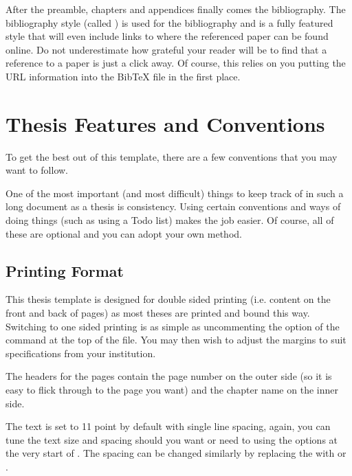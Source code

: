 After the preamble, chapters and appendices finally comes the bibliography. The 
bibliography style (called ) is used for the bibliography and 
is a fully featured style that will even include links to where the referenced 
paper can be found online. Do not underestimate how grateful your reader will be 
to find that a reference to a paper is just a click away. Of course, this relies 
on you putting the URL information into the BibTeX file in the first place.


\section{Thesis Features and Conventions}\label{ThesisConventions}

To get the best out of this template, there are a few conventions that you may 
want to follow.

One of the most important (and most difficult) things to keep track of in such 
a long document as a thesis is consistency. Using certain conventions and ways 
of doing things (such as using a Todo list) makes the job easier. Of course, 
all of these are optional and you can adopt your own method.

\subsection{Printing Format}

This thesis template is designed for double sided printing (i.e. content on the 
front and back of pages) as most theses are printed and bound this way. 
Switching to one sided printing is as simple as uncommenting the  
option of the  command at the top of the  file. 
You may then wish to adjust the margins to suit specifications from your institution.

The headers for the pages contain the page number on the outer side (so it is 
easy to flick through to the page you want) and the chapter name on the inner side.

The text is set to 11 point by default with single line spacing, again, you can 
tune the text size and spacing should you want or need to using the options at 
the very start of . The spacing can be changed similarly by 
replacing the  with  or 
.

